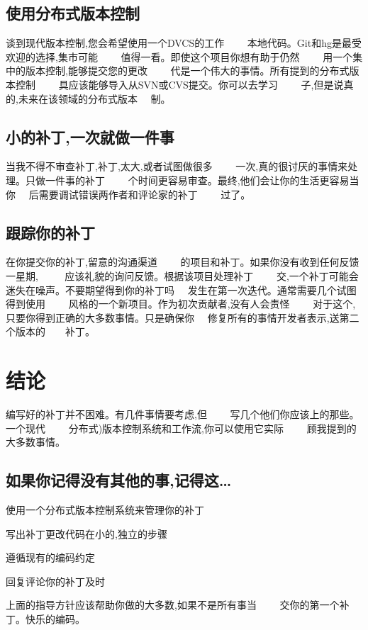\subsection*{使用分布式版本控制}

谈到现代版本控制,您会希望使用一个DVCS的工作　　
本地代码。Git和hg是最受欢迎的选择,集市可能　　
值得一看。即使这个项目你想有助于仍然　　
用一个集中的版本控制,能够提交您的更改　　
代是一个伟大的事情。所有提到的分布式版本控制　　
具应该能够导入从SVN或CVS提交。你可以去学习　　
子,但是说真的,未来在该领域的分布式版本　
制。

\subsection*{小的补丁,一次就做一件事}

当我不得不审查补丁,补丁,太大,或者试图做很多　　
一次,真的很讨厌的事情来处理。只做一件事的补丁　　
个时间更容易审查。最终,他们会让你的生活更容易当你　
后需要调试错误两作者和评论家的补丁　　
过了。

\subsection*{跟踪你的补丁}

在你提交你的补丁,留意的沟通渠道　　
的项目和补丁。如果你没有收到任何反馈一星期, 　　
应该礼貌的询问反馈。根据该项目处理补丁　　
交,一个补丁可能会迷失在噪声。不要期望得到你的补丁吗　
发生在第一次迭代。通常需要几个试图得到使用　　
风格的一个新项目。作为初次贡献者,没有人会责怪　　
对于这个,只要你得到正确的大多数事情。只是确保你　
修复所有的事情开发者表示,送第二个版本的　　补丁。

\section*{结论}

编写好的补丁并不困难。有几件事情要考虑,但　　
写几个他们你应该上的那些。一个现代　　
分布式)版本控制系统和工作流,你可以使用它实际　　
顾我提到的大多数事情。

\subsection*{如果你记得没有其他的事,记得这\ldots}

\begin{ 逐条列记}
  \item 使用一个分布式版本控制系统来管理你的补丁
  \item 写出补丁更改代码在小的,独立的步骤
  \item 遵循现有的编码约定
  \item 回复评论你的补丁及时
\end{ 逐条列记}

上面的指导方针应该帮助你做的大多数,如果不是所有事当　　
交你的第一个补丁。快乐的编码。
